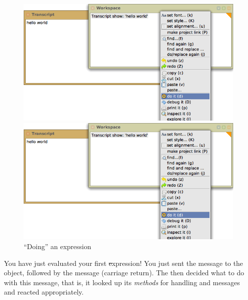 \documentclass[a4paper,10pt,twoside]{book}
\begin{document}
\begin{figure}[htb]
\ifluluelse
	{\centerline {\includegraphics[width=\textwidth]{Doit}}}
	{\centerline {\includegraphics[scale=0.65]{Doit}}}
\caption{``Doing'' an expression\label{fig:doit}}
\end{figure}

You have just evaluated your first \st expression!
You just sent the message  to the  object, followed by the message  (carriage return).
The  then decided what to do with this message, that is, it looked up its \emph{methods} for handling  and  messages and reacted appropriately.
\end{document}
